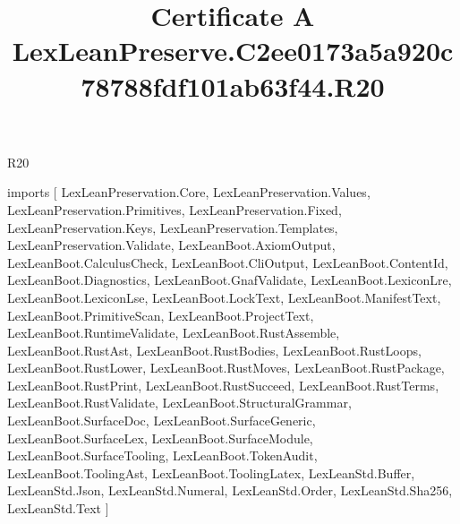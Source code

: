 \begin{lexlean}{R20}
\title{Certificate A LexLeanPreserve.C2ee0173a5a920c78788fdf101ab63f44.R20}
\begin{coremodule}
imports [
  LexLeanPreservation.Core,
  LexLeanPreservation.Values,
  LexLeanPreservation.Primitives,
  LexLeanPreservation.Fixed,
  LexLeanPreservation.Keys,
  LexLeanPreservation.Templates,
  LexLeanPreservation.Validate,
  LexLeanBoot.AxiomOutput,
  LexLeanBoot.CalculusCheck,
  LexLeanBoot.CliOutput,
  LexLeanBoot.ContentId,
  LexLeanBoot.Diagnostics,
  LexLeanBoot.GnafValidate,
  LexLeanBoot.LexiconLre,
  LexLeanBoot.LexiconLse,
  LexLeanBoot.LockText,
  LexLeanBoot.ManifestText,
  LexLeanBoot.PrimitiveScan,
  LexLeanBoot.ProjectText,
  LexLeanBoot.RuntimeValidate,
  LexLeanBoot.RustAssemble,
  LexLeanBoot.RustAst,
  LexLeanBoot.RustBodies,
  LexLeanBoot.RustLoops,
  LexLeanBoot.RustLower,
  LexLeanBoot.RustMoves,
  LexLeanBoot.RustPackage,
  LexLeanBoot.RustPrint,
  LexLeanBoot.RustSucceed,
  LexLeanBoot.RustTerms,
  LexLeanBoot.RustValidate,
  LexLeanBoot.StructuralGrammar,
  LexLeanBoot.SurfaceDoc,
  LexLeanBoot.SurfaceGeneric,
  LexLeanBoot.SurfaceLex,
  LexLeanBoot.SurfaceModule,
  LexLeanBoot.SurfaceTooling,
  LexLeanBoot.TokenAudit,
  LexLeanBoot.ToolingAst,
  LexLeanBoot.ToolingLatex,
  LexLeanStd.Buffer,
  LexLeanStd.Json,
  LexLeanStd.Numeral,
  LexLeanStd.Order,
  LexLeanStd.Sha256,
  LexLeanStd.Text
]


\end{coremodule}
\end{lexlean}
